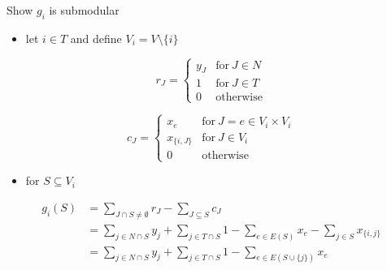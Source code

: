 \documentclass[usenames,dvipsnames]{beamer}
\begin{document}
\begin{frame}{Show $g_i$ is submodular}
  \begin{itemize}
    \item let $i \in T$ and define $V_i = V \setminus \{i\}$
  \end{itemize}
  \begin{minipage}{0.49\textwidth}
    \[r_J = \begin{cases} y_J & \text{for}~J \in N\\
      1 & \text{for}~J \in T\\ 0 & \text{otherwise}\end{cases}\]
  \end{minipage}
  \begin{minipage}{0.49\textwidth}
    \[c_J = \begin{cases} x_{e} & \text{for}~J=e \in V_i \times V_i \\
      x_{\{i,J\}} & \text{for}~J \in V_i \\
      0 & \text{otherwise}\end{cases}\]
  \end{minipage}
  \begin{itemize}
    \item for $S \subseteq V_i$
  \end{itemize}
  \begin{align*}
    g_i(S) &= \sum\limits_{J \cap S \neq \emptyset} r_J - \sum\limits_{J \subseteq S} c_J \\
    &= \sum\limits_{j \in N \cap S} y_j + \sum\limits_{j \in T \cap S} 1 - \sum\limits_{e \in E(S)} x_e - \sum\limits_{j \in S} x_{\{i,j\}} \\
    &= \sum\limits_{j \in N \cap S} y_j + \sum\limits_{j \in T \cap S} 1 - \sum\limits_{e \in E(S \cup \{j\})} x_e
  \end{align*}
\end{frame}
\end{document}
